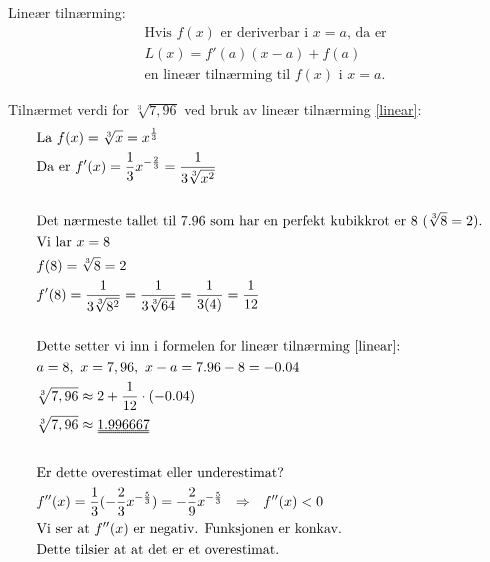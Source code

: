 \newpage


Lineær tilnærming:
\begin{equation}
\label{linear}
\begin{split}
&\text{Hvis $f(x)$ er deriverbar i $x=a$, da er}\\[0.1cm]
&L(x) = f'(a)(x-a) + f(a)\\[0.1cm]
&\text{en lineær tilnærming til $f(x)$ i $x=a$.}
\end{split}
\end{equation}

\vspace{0.5cm}

Tilnærmet verdi for $\sqrt[3]{7,96}$ ved bruk av lineær tilnærming \eqref{linear}:
\begin{align*}
&\text{La } f(x) = \sqrt[3]{x} = x^{\frac{1}{3}}\\
&\text{Da er } f'(x) = \frac{1}{3} x^{- \frac{2}{3}} = \frac{1}{3 \sqrt[3]{x^2}}\\\\
&\text{Det nærmeste tallet til $7.96$ som har en perfekt kubikkrot er $8$ ($\sqrt[3]{8} = 2$).}\\
&\text{Vi lar } x = 8\\
&f(8) = \sqrt[3]{8} = 2\\
&f'(8) = \frac{1}{3 \sqrt[3]{8^2}} = \frac{1}{3 \sqrt[3]{64}} = \frac{1}{3(4)} = \frac{1}{12}\\\\
&\text{Dette setter vi inn i formelen for lineær tilnærming \eqref{linear}:}\\
&a = 8, \ x = 7,96, \ x - a = 7.96 - 8 = -0.04\\
&\sqrt[3]{7,96} \approx 2 + \frac{1}{12} \cdot (-0.04)\\
&\sqrt[3]{7,96} \approx \uuline{1.996667}\\\\
&\text{Er dette overestimat eller underestimat?}\\
&f''(x) = \frac{1}{3} (- \frac{2}{3} x^{-\frac{5}{3}}) = - \frac{2}{9} x^{-\frac{5}{3}} \ \ \Rightarrow \ \ f''(x) < 0\\
&\text{Vi ser at $f''(x)$ er negativ. Funksjonen er konkav.}\\
&\text{Dette tilsier at at det er et overestimat.}
\end{align*}

\newpage

